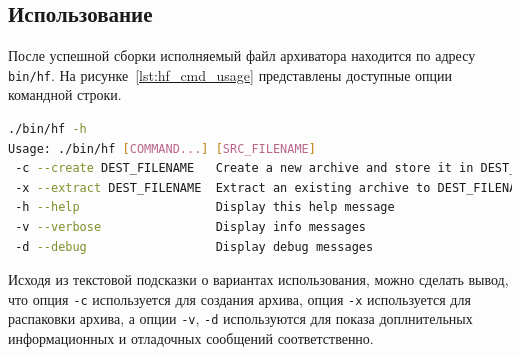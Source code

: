 



\subsection{Использование}

После успешной сборки исполняемый файл архиватора находится по адресу
\texttt{bin/hf}. На рисунке~\ref{lst:hf_cmd_usage} представлены доступные опции
командной строки.

\begin{lstlisting}[basicstyle=\scriptsize\ttfamily,
                   numberstyle=\scriptsize\ttfamily,
                   xleftmargin=7mm,
                   language=bash,
                   caption=Доступные опции \\
                   командной строки архиватора,
                   label=lst:hf_cmd_usage]
./bin/hf -h 
Usage: ./bin/hf [COMMAND...] [SRC_FILENAME]
 -c --create DEST_FILENAME   Create a new archive and store it in DEST_FILENAME
 -x --extract DEST_FILENAME  Extract an existing archive to DEST_FILENAME
 -h --help                   Display this help message
 -v --verbose                Display info messages
 -d --debug                  Display debug messages
\end{lstlisting}

Исходя из текстовой подсказки о вариантах использования, можно сделать вывод,
что опция \texttt{-c} используется для создания архива,
опция \texttt{-x} используется для распаковки архива,
а опции \texttt{-v}, \texttt{-d} используются для показа доплнительных
информационных и отладочных сообщений соответственно.

